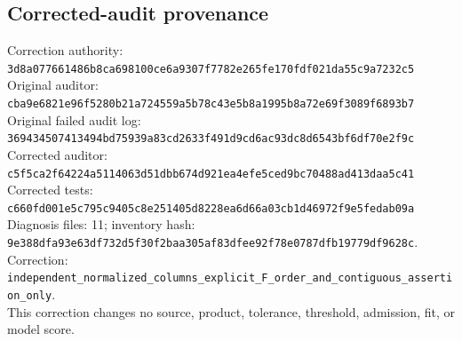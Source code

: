 \documentclass{article}
\begin{document}
\subsection*{Corrected-audit provenance}
Correction authority: \texttt{3d8a0776\allowbreak{}61486b8c\allowbreak{}a698100c\allowbreak{}e6a9307f\allowbreak{}7782e265\allowbreak{}fe170fdf\allowbreak{}021da55c\allowbreak{}9a7232c5}\\
Original auditor: \texttt{cba9e682\allowbreak{}1e96f528\allowbreak{}0b21a724\allowbreak{}559a5b78\allowbreak{}c43e5b8a\allowbreak{}1995b8a7\allowbreak{}2e69f308\allowbreak{}9f6893b7}\\
Original failed audit log: \texttt{36943450\allowbreak{}7413494b\allowbreak{}d75939a8\allowbreak{}3cd2633f\allowbreak{}491d9cd6\allowbreak{}ac93dc8d\allowbreak{}6543bf6d\allowbreak{}f70e2f9c}\\
Corrected auditor: \texttt{c5f5ca2f\allowbreak{}64224a51\allowbreak{}14063d51\allowbreak{}dbb674d9\allowbreak{}21ea4efe\allowbreak{}5ced9bc7\allowbreak{}0488ad41\allowbreak{}3daa5c41}\\
Corrected tests: \texttt{c660fd00\allowbreak{}1e5c795c\allowbreak{}9405c8e2\allowbreak{}51405d82\allowbreak{}28ea6d66\allowbreak{}a03cb1d4\allowbreak{}6972f9e5\allowbreak{}fedab09a}\\
Diagnosis files: 11; inventory hash: \texttt{9e388dfa\allowbreak{}93e63df7\allowbreak{}32d5f30f\allowbreak{}2baa305a\allowbreak{}f83dfee9\allowbreak{}2f78e078\allowbreak{}7dfb1977\allowbreak{}9df9628c}.\\
Correction: \texttt{independent\_\allowbreak{}normalized\_\allowbreak{}columns\_\allowbreak{}explicit\_\allowbreak{}F\_\allowbreak{}order\_\allowbreak{}and\_\allowbreak{}contiguous\_\allowbreak{}assertion\_\allowbreak{}only}.\\
This correction changes no source, product, tolerance, threshold, admission, fit, or model score.

\par\endgroup
\end{document}
